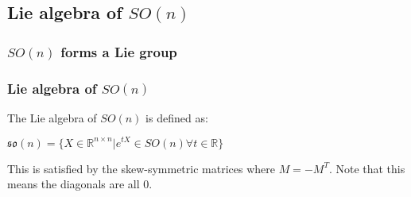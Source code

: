 \subsection{Lie algebra of \(SO(n)\)}

\subsubsection{\(SO(n)\) forms a Lie group}

\subsubsection{Lie algebra of \(SO(n)\)}

The Lie algebra of \(SO(n)\) is defined as:

\(\mathfrak{so}(n)=\{X\in \mathbb {R}^{n\times n}|e^{tX}\in SO(n) \forall t\in \mathbb{R}\}\)

This is satisfied by the skew-symmetric matrices where \(M=-M^T\). Note that this means the diagonals are all \(0\).


